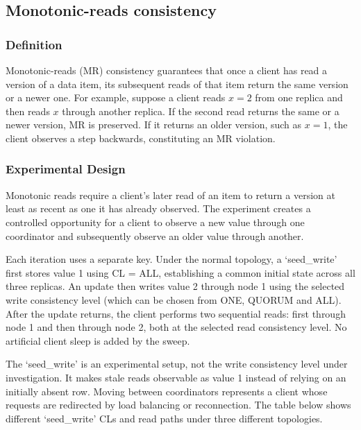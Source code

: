 \subsection{Monotonic-reads consistency}\label{mr:monotonic-reads-consistency}

\subsubsection{Definition}\label{mr:definition}

Monotonic-reads (MR) consistency guarantees that once a client has read a version of a data item, its subsequent reads of that item return the same version or a newer one. For example, suppose a client reads \(x=2\) from one replica and then reads \(x\) through another replica. If the second read returns the same or a newer version, MR is preserved. If it returns an older version, such as \(x=1\), the client observes a step backwards, constituting an MR violation.

\subsubsection{Experimental Design}\label{mr:experimental-design}

Monotonic reads require a client's later read of an item to return a version at least as recent as one it has already observed. The experiment creates a controlled opportunity for a client to observe a new value through one coordinator and subsequently observe an older value through another.

Each iteration uses a separate key. Under the normal topology, a `seed\_write' first stores value 1 using CL = ALL, establishing a common initial state across all three replicas. An update then writes value 2 through node 1 using the selected write consistency level (which can be chosen from ONE, QUORUM and ALL). After the update returns, the client performs two sequential reads: first through node 1 and then through node 2, both at the selected read consistency level. No artificial client sleep is added by the sweep.

The `seed\_write' is an experimental setup, not the write consistency level under investigation. It makes stale reads observable as value 1 instead of relying on an initially absent row. Moving between coordinators represents a client whose requests are redirected by load balancing or reconnection. The table below shows different `seed\_write' CLs and read paths under three different topologies.

